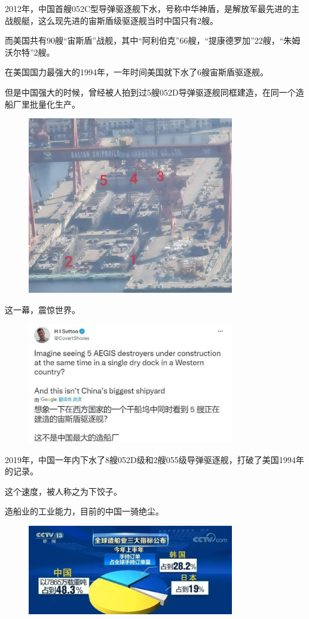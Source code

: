 \documentclass[UTF8, 11pt, oneside]{ctexart}
\begin{document}
2012年，中国首艘052C型导弹驱逐舰下水，号称中华神盾，是解放军最先进的主战舰艇，这么现先进的宙斯盾级驱逐舰当时中国只有2艘。

而美国共有90艘“宙斯盾”战舰，其中“阿利伯克”66艘，“提康德罗加”22艘，“朱姆沃尔特”2艘。

在美国国力最强大的1994年，一年时间美国就下水了6艘宙斯盾驱逐舰。

但是中国强大的时候，曾经被人拍到过5艘052D导弹驱逐舰同框建造，在同一个造船厂里批量化生产。

\begin{figure}[H]
    \centering
    \includegraphics[width=9cm]{2024-08-18-009.jpg}
\end{figure}

这一幕，震惊世界。

\begin{figure}[H]
    \centering
    \includegraphics[width=9cm]{2024-08-18-010.jpg}
\end{figure}

2019年，中国一年内下水了8艘052D级和2艘055级导弹驱逐舰，打破了美国1994年的记录。

这个速度，被人称之为下饺子。

造船业的工业能力，目前的中国一骑绝尘。

\begin{figure}[H]
    \centering
    \includegraphics[width=9cm]{2024-08-18-011.jpg}
\end{figure}
\end{document}
